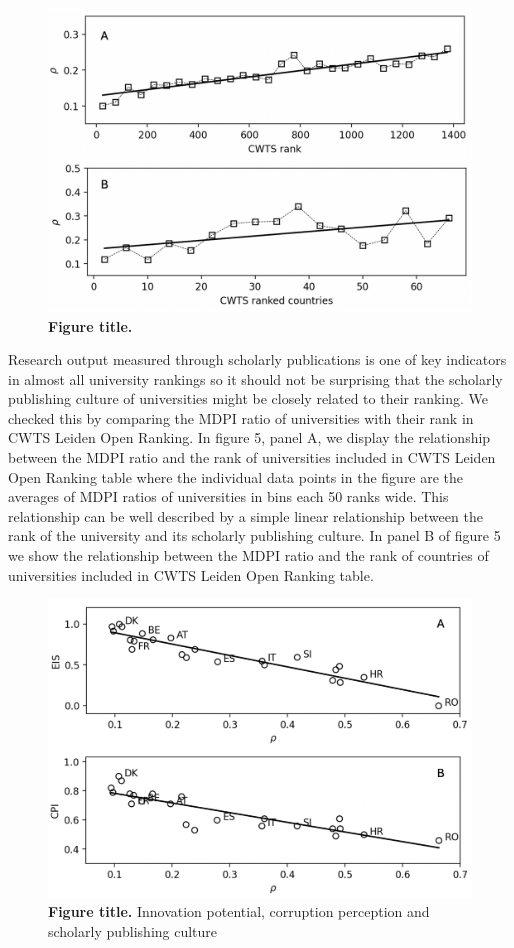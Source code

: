 \documentclass[amsfonts, amssymb, prl, superscriptaddress, notitlepage, twocolumn, nofootinbib]{revtex4-2}
\begin{document}
\begin{figure}
    \centering
    \includegraphics[width=1.0\linewidth]{Fig03f.png}
    \caption{\label{fig:fig5} {\bf Figure title.} 
}
\end{figure}

Research output measured through scholarly publications is one of key indicators in almost all university rankings so it should not be surprising that the scholarly publishing culture of universities might be closely related to their ranking. We checked this by comparing the MDPI ratio of universities with their rank in CWTS Leiden Open Ranking. In figure 5, panel A, we display the relationship between the MDPI ratio and the rank of universities included in CWTS Leiden Open Ranking table where the individual data points in the figure are the averages of MDPI ratios of universities in bins each 50 ranks wide. This relationship can be well described by a simple linear relationship between the rank of the university and its scholarly publishing culture. In panel B of figure 5 we show the relationship between the MDPI ratio and the rank of countries of universities included in CWTS Leiden Open Ranking table.



\begin{figure}
    \centering
    \includegraphics[width=1.0\linewidth]{Fig04f.png}
    \caption{\label{fig:fig6} {\bf Figure title.} Innovation potential, corruption perception and scholarly publishing culture
}
\end{figure}
\end{document}

